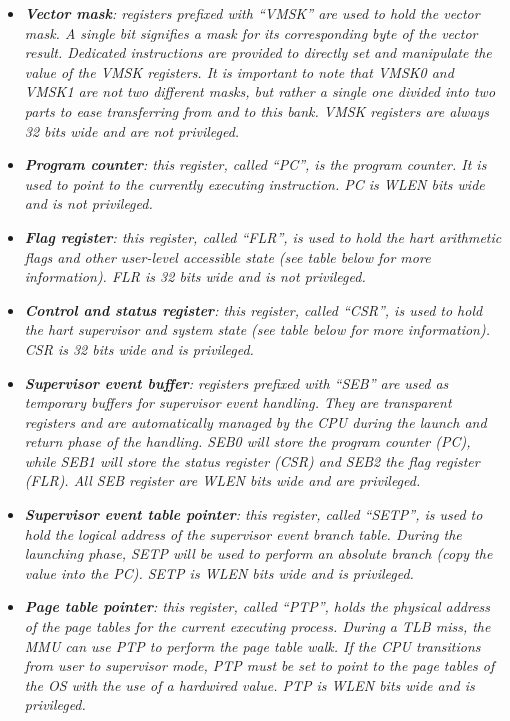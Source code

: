 \documentclass{article}
\begin{document}
\begin{itemize}
                    \item \textit{\textbf{Vector mask}: registers prefixed with ``VMSK'' are used to hold the vector mask. A single bit signifies a mask for its corresponding byte of the vector result. Dedicated instructions are provided to directly set and manipulate the value of the VMSK registers. It is important to note that VMSK0 and VMSK1 are not two different masks, but rather a single one divided into two parts to ease transferring from and to this bank. VMSK registers are always 32 bits wide and are not privileged.}

                    \item \textit{\textbf{Program counter}: this register, called ``PC'', is the program counter. It is used to point to the currently executing instruction. PC is WLEN bits wide and is not privileged.}

                    \item \textit{\textbf{Flag register}: this register, called ``FLR'', is used to hold the hart arithmetic flags and other user-level accessible state (see table below for more information). FLR is 32 bits wide and is not privileged.}

                    \item \textit{\textbf{Control and status register}: this register, called ``CSR'', is used to hold the hart supervisor and system state (see table below for more information). CSR is 32 bits wide and is privileged.}

                    \item \textit{\textbf{Supervisor event buffer}: registers prefixed with ``SEB'' are used as temporary buffers for supervisor event handling. They are transparent registers and are automatically managed by the CPU during the launch and return phase of the handling. SEB0 will store the program counter (PC), while SEB1 will store the status register (CSR) and SEB2 the flag register (FLR). All SEB register are WLEN bits wide and are privileged.}

                    \item \textit{\textbf{Supervisor event table pointer}: this register, called ``SETP'', is used to hold the logical address of the supervisor event branch table. During the launching phase, SETP will be used to perform an absolute branch (copy the value into the PC). SETP is WLEN bits wide and is privileged.}

                    \item \textit{\textbf{Page table pointer}: this register, called ``PTP'', holds the physical address of the page tables for the current executing process. During a TLB miss, the MMU can use PTP to perform the page table walk. If the CPU transitions from user to supervisor mode, PTP must be set to point to the page tables of the OS with the use of a hardwired value. PTP is WLEN bits wide and is privileged.}


\end{itemize}
\end{document}
